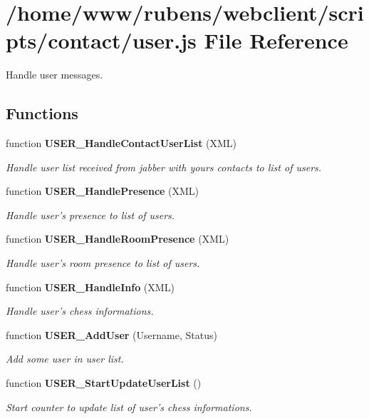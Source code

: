 \section{/home/www/rubens/webclient/scripts/contact/user.js File Reference}
\label{contact_2user_8js}
Handle user messages. 

\subsection*{Functions}
\begin{CompactItemize}
\item 
function {\bf USER\_\-HandleContactUserList} (XML)
\begin{CompactList}\small\item\em Handle user list received from jabber with yours contacts to list of users. \item\end{CompactList}\item 
function {\bf USER\_\-HandlePresence} (XML)
\begin{CompactList}\small\item\em Handle user's presence to list of users. \item\end{CompactList}\item 
function {\bf USER\_\-HandleRoomPresence} (XML)
\begin{CompactList}\small\item\em Handle user's room presence to list of users. \item\end{CompactList}\item 
function {\bf USER\_\-HandleInfo} (XML)
\begin{CompactList}\small\item\em Handle user's chess informations. \item\end{CompactList}\item 
function {\bf USER\_\-AddUser} (Username, Status)
\begin{CompactList}\small\item\em Add some user in user list. \item\end{CompactList}\item 
function {\bf USER\_\-StartUpdateUserList} ()
\begin{CompactList}\small\item\em Start counter to update list of user's chess informations. \item\end{CompactList}\item 

\end{CompactItemize}
